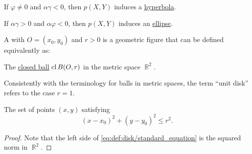 \begin{algorithm}
\begin{thmenum}
\begin{thmenum}
       If \( \varphi \neq 0 \) and \( \alpha \gamma < 0 \), then \( p(X, Y) \) induces a \hyperref[def:hyperbola]{hyperbola}.

       If \( \alpha \gamma > 0 \) and \( \alpha \varphi < 0 \), then \( p(X, Y) \) induces an \hyperref[def:ellipse]{ellipse}.
    \end{thmenum}
  \end{thmenum}
\end{algorithm}

\begin{definition}\label{def:disk}
  A  with  \( O = (x_0, y_0) \) and  \( r > 0 \) is a geometric figure that can be defined equivalently as:

  \begin{thmenum}
     The \hyperref[def:metric_space/ball]{closed ball} \( \operatorname{cl} B(O, r) \) in the metric space \( \BbbR^2 \).

    Consistently with the terminology for balls in metric spaces, the term \enquote{unit disk} refers to the case \( r = 1 \).

     The set of points \( (x, y) \) satisfying
    \begin{equation}\label{eq:def:disk/standard_equation}
      (x - x_0)^2 + (y - y_0)^2 \leq r^2.
    \end{equation}
  \end{thmenum}
\end{definition}
\begin{proof}
  Note that the left side of \eqref{eq:def:disk/standard_equation} is the squared norm in \( \BbbR^2 \).
\end{proof}

